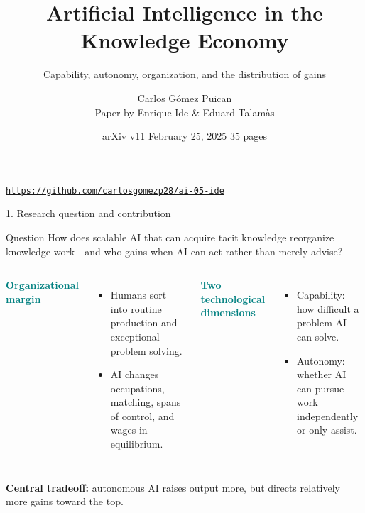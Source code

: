 \documentclass[aspectratio=169,11pt]{beamer}
\title{Artificial Intelligence in the Knowledge Economy}
\subtitle{Capability, autonomy, organization, and the distribution of gains}
\author{Carlos G\'omez Puican\\[1mm]\small Paper by Enrique Ide \& Eduard Talam\`as}
\institute{Repository 5}
\date{arXiv v11 \textperiodcentered{} February 25, 2025 \textperiodcentered{} 35 pages}
\newcommand{\key}[1]{\textcolor{teal}{\textbf{#1}}}
\begin{document}
\begin{frame}[plain]
  \titlepage
  \vspace{-1.2em}
  \begin{center}
    \small
    \href{https://github.com/carlosgomezp28/ai-05-ide}%
      {\texttt{https://github.com/carlosgomezp28/ai-05-ide}}
  \end{center}
\end{frame}

\begin{frame}{1. Research question and contribution}
  \begin{block}{Question}
    How does scalable AI that can acquire tacit knowledge reorganize knowledge work---and who gains when AI can act rather than merely advise?
  \end{block}

  \begin{columns}[T,onlytextwidth]
      \key{Organizational margin}
      \begin{itemize}\small
        \item Humans sort into routine production and exceptional problem solving.
        \item AI changes occupations, matching, spans of control, and wages in equilibrium.
      \end{itemize}
      \key{Two technological dimensions}
      \begin{itemize}\small
        \item Capability: how difficult a problem AI can solve.
        \item Autonomy: whether AI can pursue work independently or only assist.
      \end{itemize}
  \end{columns}

  \medskip
  \centering
  \textbf{Central tradeoff:} autonomous AI raises output more, but directs relatively more gains toward the top.
\end{frame}
\end{document}
